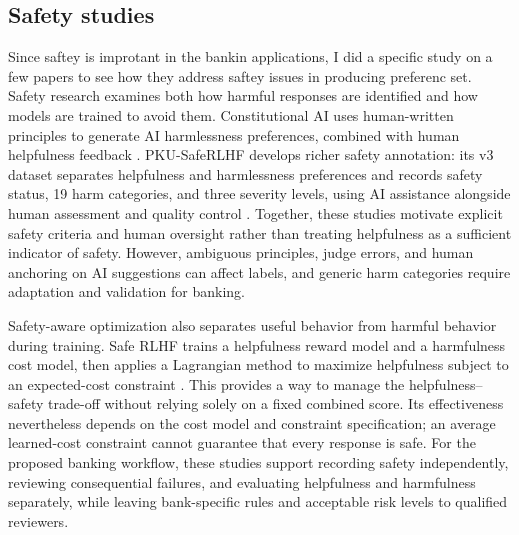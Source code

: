 \documentclass[11pt]{article}
\begin{document}
\subsection{Safety studies}
Since saftey is improtant in the bankin applications, I did a specific study on a few papers to see how they address saftey issues in producing preferenc set. Safety research examines both how harmful responses are identified and how models are trained to avoid them. Constitutional AI uses human-written principles to generate AI harmlessness preferences, combined with human helpfulness feedback \cite{cai}. PKU-SafeRLHF develops richer safety annotation: its v3 dataset separates helpfulness and harmlessness preferences and records safety status, 19 harm categories, and three severity levels, using AI assistance alongside human assessment and quality control \cite{pkusafe}. Together, these studies motivate explicit safety criteria and human oversight rather than treating helpfulness as a sufficient indicator of safety. However, ambiguous principles, judge errors, and human anchoring on AI suggestions can affect labels, and generic harm categories require adaptation and validation for banking.

Safety-aware optimization also separates useful behavior from harmful behavior during training. Safe RLHF trains a helpfulness reward model and a harmfulness cost model, then applies a Lagrangian method to maximize helpfulness subject to an expected-cost constraint \cite{saferlhf}. This provides a way to manage the helpfulness--safety trade-off without relying solely on a fixed combined score. Its effectiveness nevertheless depends on the cost model and constraint specification; an average learned-cost constraint cannot guarantee that every response is safe. For the proposed banking workflow, these studies support recording safety independently, reviewing consequential failures, and evaluating helpfulness and harmfulness separately, while leaving bank-specific rules and acceptable risk levels to qualified reviewers.
\end{document}

